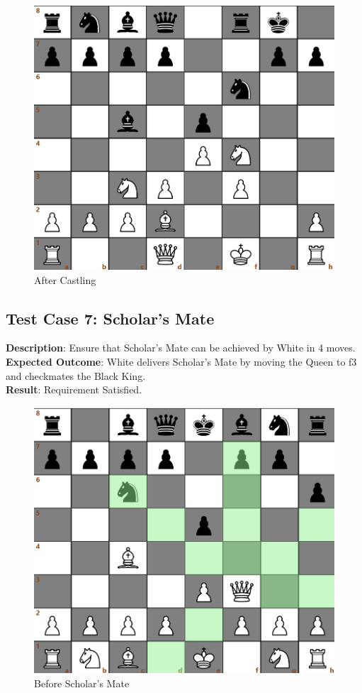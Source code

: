 \documentclass[a4paper,12pt]{article}
\begin{document}
\begin{figure}[H]
    \centering
    \includegraphics[width=0.6\linewidth]{Images/Test Cases/testCase6Img2.png}
    \caption{After Castling}
    \label{fig:AfterCastling}
\end{figure}

\subsection{Test Case 7: Scholar's Mate}
\textbf{Description}: Ensure that Scholar's Mate can be achieved by White in 4 moves.\\
\textbf{Expected Outcome}: White delivers Scholar's Mate by moving the Queen to f3 and checkmates the Black King.\\
\textbf{Result}: Requirement Satisfied.

\begin{figure}[H]
    \centering
    \includegraphics[width=0.6\linewidth]{Images/Test Cases/testCase7Img1.png}
    \caption{Before Scholar's Mate}
    \label{fig:BeforeScholarsMate}
\end{figure}
\end{document}
